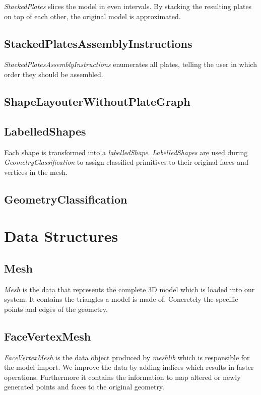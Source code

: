 \documentclass[../ClassicThesis.tex]{subfiles}
\begin{document}
\emph{StackedPlates} slices the model in even intervals. By stacking the resulting plates on top of each other, the original model is approximated.


\subsection*{StackedPlatesAssemblyInstructions}

\emph{StackedPlatesAssemblyInstructions} enumerates all plates, telling the user in which order they should be assembled.


\subsection*{ShapeLayouterWithoutPlateGraph}




\subsection*{LabelledShapes}

Each shape is transformed into a \emph{labelledShape}. \emph{LabelledShapes} are used during \emph{GeometryClassification} to assign classified primitives to their original faces and vertices in the mesh.


\subsection*{GeometryClassification}




\section{Data Structures}

\subsection*{Mesh}

\emph{Mesh} is the data that represents the complete 3D model which is loaded into our system. It contains the triangles a model is made of. Concretely the specific points and edges of the geometry.

\subsection*{FaceVertexMesh}

\emph{FaceVertexMesh} is the data object produced by \emph{meshlib} which is responsible for the model import. We improve the data by adding indices which results in faster operations. Furthermore it contains the information to map altered or newly generated points and faces to the original geometry.
\end{document}

